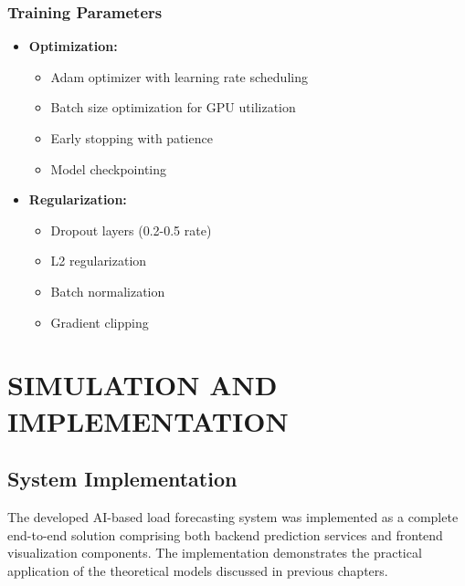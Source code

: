 \documentclass[12pt,a4paper]{report}
\begin{document}
\subsection{Training Parameters}
\begin{itemize}
\item \textbf{Optimization:}
  \begin{itemize}
    \item Adam optimizer with learning rate scheduling
    \item Batch size optimization for GPU utilization
    \item Early stopping with patience
    \item Model checkpointing
  \end{itemize}

\item \textbf{Regularization:}
  \begin{itemize}
    \item Dropout layers (0.2-0.5 rate)
    \item L2 regularization
    \item Batch normalization
    \item Gradient clipping
  \end{itemize}
\end{itemize}


\begin{table}[htbp]
\caption{Sample Table}
\vspace{0.5cm}
\end{table}


\chapter{SIMULATION AND IMPLEMENTATION}
\section{System Implementation}
The developed AI-based load forecasting system was implemented as a complete end-to-end solution comprising both backend prediction services and frontend visualization components. The implementation demonstrates the practical application of the theoretical models discussed in previous chapters.
\end{document}
